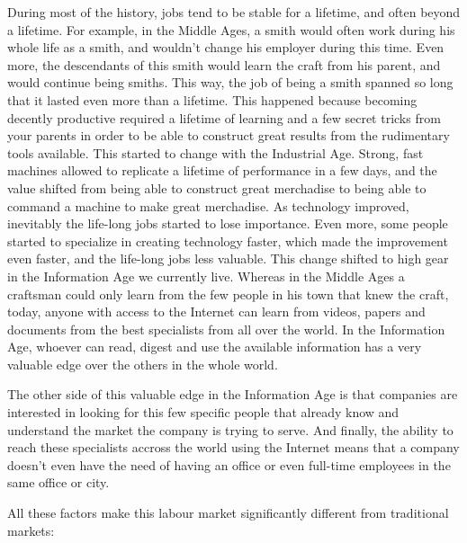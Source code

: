 \documentclass{article}
\begin{document}
During most of the history, jobs tend to be stable for a lifetime, and often beyond a lifetime. For example, in the Middle Ages, a smith would often work during his whole life as a smith, and wouldn't change his employer during this time. Even more, the descendants of this smith would learn the craft from his parent, and would continue being smiths. This way, the job of being a smith spanned so long that it lasted even more than a lifetime. This happened because becoming decently productive required a lifetime of learning and a few secret tricks from your parents in order to be able to construct great results from the rudimentary tools available. This started to change with the Industrial Age. Strong, fast machines allowed to replicate a lifetime of performance in a few days, and the value shifted from being able to construct great merchadise to being able to command a machine to make great merchadise. As technology improved, inevitably the life-long jobs started to lose importance. Even more, some people started to specialize in creating technology faster, which made the improvement even faster, and the life-long jobs less valuable. This change shifted to high gear in the Information Age we currently live. Whereas in the Middle Ages a craftsman could only learn from the few people in his town that knew the craft, today, anyone with access to the Internet can learn from videos, papers and documents from the best specialists from all over the world. In the Information Age, whoever can read, digest and use the available information has a very valuable edge over the others in the whole world.

The other side of this valuable edge in the Information Age is that companies are interested in looking for this few specific people that already know and understand the market the company is trying to serve. And finally, the ability to reach these specialists accross the world using the Internet means that a company doesn't even have the need of having an office or even full-time employees in the same office or city.

All these factors make this labour market significantly different from traditional markets:
\end{document}
